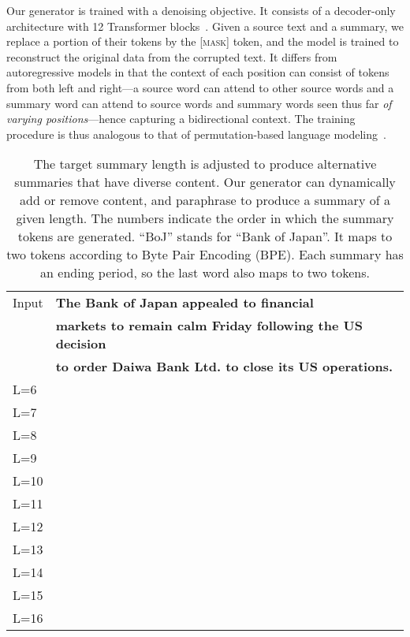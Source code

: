 \documentclass[11pt]{article}
\begin{document}
Our generator is trained with a denoising objective.
It consists of a decoder-only architecture with 12 Transformer blocks~\cite{NIPS2019_9464}.
Given a source text and a summary, we replace a portion of their tokens by the \textsc{[mask]} token, and the model is trained to reconstruct the original data from the corrupted text.
It differs from autoregressive models in that the context of each position can consist of tokens from both left and right—a source word can attend to other source words and a summary word can attend to source words and summary words seen thus far \emph{of varying positions}—hence capturing a bidirectional context.
The training procedure is thus analogous to that of permutation-based language modeling~\cite{NIPS2019_8812}.


\begin{table}[t]
\centering
\setlength{\tabcolsep}{3pt}
\renewcommand{\arraystretch}{1.2}
\centering
\begin{fontpbk}
\begin{scriptsize}
\begin{tabular}{l|l}
Input & \textbf{The Bank of Japan appealed to financial}\\
& \textbf{markets to remain calm Friday following the US decision}\\
& \textbf{to order Daiwa Bank Ltd. to close its US operations.}\\
\hline
\hline
\Bstrut L=6 & \\ 
L=7 & \\
L=8 & \\
L=9 & \\
L=10 & \\
L=11 & \\
L=12 & \\
L=13 & \\
L=14 & \\
L=15 & \\
L=16 & \\
\end{tabular}
\end{scriptsize}
\end{fontpbk}
\caption{
The target summary length  is adjusted to produce alternative summaries that have diverse content.
Our generator can dynamically add or remove content, and paraphrase to produce a summary of a given length.
The numbers indicate the order in which the summary tokens are generated. 
``BoJ'' stands for ``Bank of Japan''.
It maps to two tokens according to Byte Pair Encoding (BPE).
Each summary has an ending period, so the last word also maps to two tokens.
}
\label{tab:example_order}
\end{table}
\end{document}
